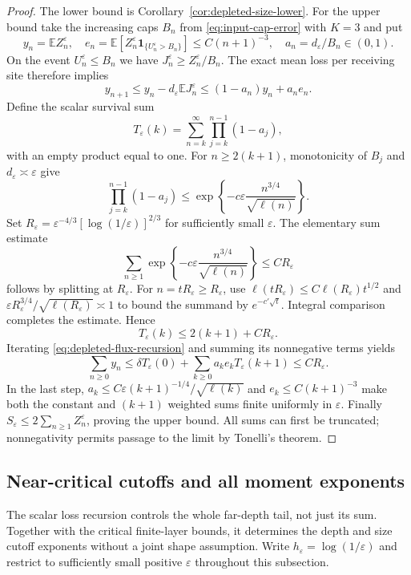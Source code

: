 \documentclass[11pt]{article}
\numberwithin{equation}{section}
\theoremstyle{definition}
\newcommand{\E}{\mathbb E}
\newcommand{\ind}{\mathbf 1}
\begin{document}
\begin{proof}
The lower bound is Corollary~\ref{cor:depleted-size-lower}. For the upper bound take the increasing caps $B_n$ from \eqref{eq:input-cap-error} with $K=3$ and put
\[
 y_n=\E Z_n^\varepsilon,\quad
 e_n=\E[Z_n^\varepsilon\ind_{\{U_n^\varepsilon>B_n\}}]
 \le C(n+1)^{-3},\quad
 a_n=d_\varepsilon/B_n\in(0,1).
\]
On the event $U_n^\varepsilon\le B_n$ we have $J_n^\varepsilon\ge Z_n^\varepsilon/B_n$. The exact mean loss per receiving site therefore implies
\begin{equation}\label{eq:depleted-flux-recursion}
 y_{n+1}\le y_n-d_\varepsilon\E J_n^\varepsilon
 \le(1-a_n)y_n+a_ne_n.
\end{equation}
Define the scalar survival sum
\[
 T_\varepsilon(k)=\sum_{n=k}^\infty
 \prod_{j=k}^{n-1}(1-a_j),
\]
with an empty product equal to one. For $n\ge2(k+1)$, monotonicity of $B_j$ and $d_\varepsilon\asymp\varepsilon$ give
\[
 \prod_{j=k}^{n-1}(1-a_j)
 \le\exp\left\{-c\varepsilon\frac{n^{3/4}}{\sqrt{\ell(n)}}\right\}.
\]
Set $R_\varepsilon=\varepsilon^{-4/3}[\log(1/\varepsilon)]^{2/3}$ for sufficiently small $\varepsilon$. The elementary sum estimate
\begin{equation}\label{eq:depleted-survival-sum}
 \sum_{n\ge1}\exp\left\{-c\varepsilon\frac{n^{3/4}}{\sqrt{\ell(n)}}\right\}
 \le C R_\varepsilon
\end{equation}
follows by splitting at $R_\varepsilon$. For $n=tR_\varepsilon\ge R_\varepsilon$, use $\ell(tR_\varepsilon)\le C\ell(R_\varepsilon)t^{1/2}$ and $\varepsilon R_\varepsilon^{3/4}/\sqrt{\ell(R_\varepsilon)}\asymp1$ to bound the summand by $e^{-c'\sqrt t}$. Integral comparison completes the estimate. Hence
\[
 T_\varepsilon(k)\le2(k+1)+C R_\varepsilon.
\]
Iterating \eqref{eq:depleted-flux-recursion} and summing its nonnegative terms yields
\[
 \sum_{n\ge0}y_n
 \le\delta T_\varepsilon(0)
 +\sum_{k\ge0}a_ke_kT_\varepsilon(k+1)
 \le C R_\varepsilon.
\]
In the last step, $a_k\le C\varepsilon(k+1)^{-1/4}/\sqrt{\ell(k)}$ and $e_k\le C(k+1)^{-3}$ make both the constant and $(k+1)$ weighted sums finite uniformly in $\varepsilon$. Finally $S_\varepsilon\le2\sum_{n\ge1}Z_n^\varepsilon$, proving the upper bound. All sums can first be truncated; nonnegativity permits passage to the limit by Tonelli's theorem.
\end{proof}

\subsection{Near-critical cutoffs and all moment exponents}\label{sec:near-critical-spectrum}
The scalar loss recursion controls the whole far-depth tail, not just its sum. Together with the critical finite-layer bounds, it determines the depth and size cutoff exponents without a joint shape assumption. Write $h_\varepsilon=\log(1/\varepsilon)$ and restrict to sufficiently small positive $\varepsilon$ throughout this subsection.
\end{document}
